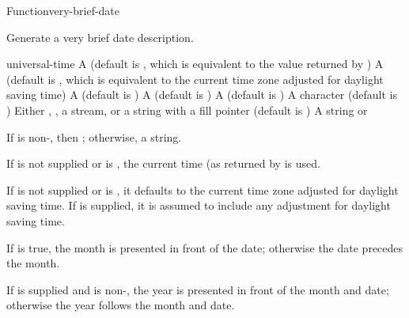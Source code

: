 \documentclass[10pt,twoside,english,pdftex]{article}
\begin{document}

\begin{functiondoc}{Function}{very-brief-date}{%
    }
% 
% 

\fnsyntax

\fnpurpose Generate a very brief date description.

\fnpackage {}

\fnmodule {}

\fnargs
\begin{args}{universal-time}
 A  (default is \nil,
  which is equivalent to the value returned by
  )
 A  (default is \nil,
  which is equivalent to the current time zone adjusted for daylight
  saving time)
 A  (default is 
)
 A  (default is
)
 A  (default is )
\arg[separator] A character (default is \code{\#\bkslash/})
\arg[destination] Either \nil, , a stream, or a string with a fill 
pointer (default is \nil)
\arg[result] A string or \nil{}
\end{args}

\fnreturns If  is non-\nil, then \nil; otherwise, a string.

\fndescription
%
%
If  is not supplied or is \nil, the current time
(as returned by  is used.  

\W{} 
%
If  is not supplied or is \nil, it defaults to the current
time zone adjusted for daylight saving time. If  is
supplied, it is assumed to include any adjustment for daylight saving time.

\W{} 
%
If  is true, the month is presented in front of the
date; otherwise the date precedes the month.

\W{} 
%
If  is supplied and is non-\nil, the year is presented in
front of the month and date; otherwise the year follows the month and date.


\end{functiondoc}
\end{document}

